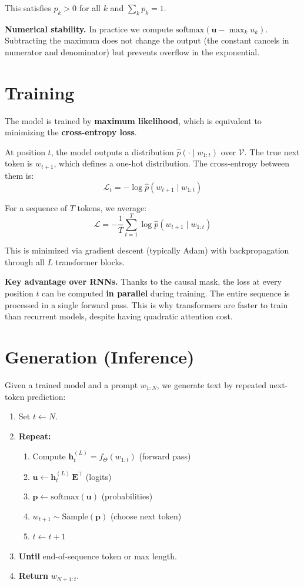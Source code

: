 \documentclass[main.tex]{subfiles}
\begin{document}
This satisfies $p_k > 0$ for all $k$ and $\sum_k p_k = 1$.

\textbf{Numerical stability.} In practice we compute $\text{softmax}(\mathbf{u} - \max_k u_k)$. Subtracting the maximum does not change the output (the constant cancels in numerator and denominator) but prevents overflow in the exponential.

\needspace{0.33\textheight}
\section{Training}

The model is trained by \textbf{maximum likelihood}, which is equivalent to minimizing the \textbf{cross-entropy loss}.

At position $t$, the model outputs a distribution $\hat{p}(\cdot \mid w_{1:t})$ over $\mathcal{V}$. The true next token is $w_{t+1}$, which defines a one-hot distribution. The cross-entropy between them is:
$$\mathcal{L}_t = -\log \hat{p}(w_{t+1} \mid w_{1:t})$$

For a sequence of $T$ tokens, we average:
$$\mathcal{L} = -\frac{1}{T} \sum_{t=1}^{T} \log \hat{p}(w_{t+1} \mid w_{1:t})$$

This is minimized via gradient descent (typically Adam) with backpropagation through all $L$ transformer blocks.

\textbf{Key advantage over RNNs.} Thanks to the causal mask, the loss at every position $t$ can be computed \textbf{in parallel} during training. The entire sequence is processed in a single forward pass. This is why transformers are faster to train than recurrent models, despite having quadratic attention cost.

\needspace{0.33\textheight}
\section{Generation (Inference)}

Given a trained model and a prompt $w_{1:N}$, we generate text by repeated next-token prediction:

\begin{enumerate}
\item Set $t \gets N$.
\item \textbf{Repeat:}
\begin{enumerate}
    \item Compute $\mathbf{h}_t^{(L)} = f_\Theta(w_{1:t})$ \hfill (forward pass)
    \item $\mathbf{u} \gets \mathbf{h}_t^{(L)} \, \mathbf{E}^\top$ \hfill (logits)
    \item $\mathbf{p} \gets \text{softmax}(\mathbf{u})$ \hfill (probabilities)
    \item $w_{t+1} \sim \text{Sample}(\mathbf{p})$ \hfill (choose next token)
    \item $t \gets t + 1$
\end{enumerate}
\item \textbf{Until} end-of-sequence token or max length.
\item \textbf{Return} $w_{N+1:t}$.
\end{enumerate}
\end{document}
